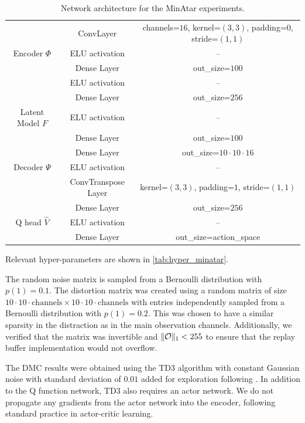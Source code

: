 \begin{table}[t]
\begin{center}
\caption{Network architecture for the MinAtar experiments.}
\label{tab:net_minatar}
\begin{tabular}{c|c|c}
     & ConvLayer & channels=$16$, kernel=$(3,3)$, padding=$0$, stride=$(1,1)$ \\
     Encoder $\Phi$ & ELU activation & -- \\
     & Dense Layer & out\_size=$100$\\
     & ELU activation & -- \\\hline
     & Dense Layer & out\_size=$256$ \\
     Latent Model $F$ & ELU activation & -- \\
     & Dense Layer & out\_size=$100$\\\hline
     & Dense Layer & out\_size=$10\cdot10\cdot16$\\
     Decoder $\Psi$ & ELU activation & -- \\
     & ConvTranspose Layer & kernel=$(3,3)$, padding=$1$,  stride=$(1,1)$\\\hline
     & Dense Layer & out\_size=$256$ \\
     Q head $\hat{V}$ & ELU activation & --\\
     & Dense Layer & out\_size=action\_space
\end{tabular}
\end{center}
\end{table}

Relevant hyper-parameters are shown in \autoref{tab:hyper_minatar}.

The random noise matrix is sampled from a Bernoulli distribution with $p(1) = 0.1$.
The distortion matrix was created using a random matrix of size $10\cdot10\cdot\mathrm{channels} \times 10\cdot10\cdot\mathrm{channels}$ with entries independently sampled from a Bernoulli distribution with $p(1) = 0.2$. 
This was chosen to have a similar sparsity in the distraction as in the main observation channels.
Additionally, we verified that the matrix was invertible and $\lVert {\mathcal{O}} \rVert_1 < 255$ to ensure that the replay buffer implementation would not overflow.


The DMC results were obtained using the TD3 algorithm \parencite{td3} with constant Gaussian noise with standard deviation of $0.01$ added for exploration following \textcite{yarats2021image}. In addition to the Q function network, TD3 also requires an actor network. We do not propagate any gradients from the actor network into the encoder, following standard practice in actor-critic learning.


